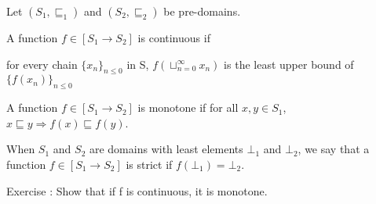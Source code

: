 \documentclass{report}[12pt]
\begin{document}
\begin{definition}
    Let $(S_1, \sqsubseteq_1)$ and $(S_2, \sqsubseteq_2)$ be pre-domains.

    A function $f\in [S_1 \rightarrow S_2]$ is continuous if

    for every chain $\{x_n\}_{n\le 0}$ in S, $f(\sqcup_{n=0}^\infty x_n)$ is the least upper bound of $\{f(x_n)\}_{n\le 0}$

    A function $f \in [S_1 \rightarrow S_2]$ is monotone if for all $x, y \in S_1$, $x\sqsubseteq y \Rightarrow f(x) \sqsubseteq f(y)$.

    When $S_1$ and $S_2$ are domains with least elements $\bot_1$ and $\bot_2$, we say that a function $f\in [S_1 \rightarrow S_2]$ is strict if $f(\bot_1) = \bot_2$.
\end{definition}
Exercise : Show that if f is continuous, it is monotone.
\end{document}
